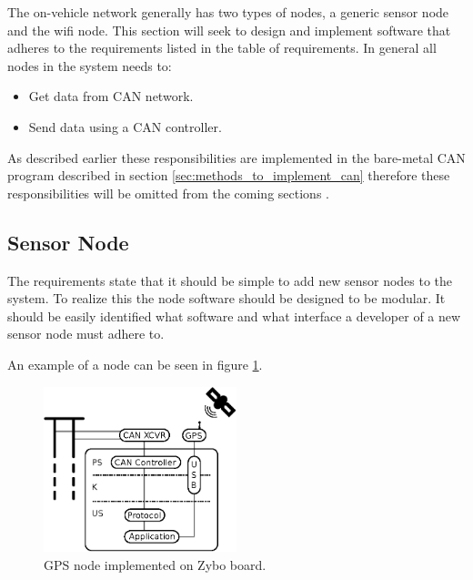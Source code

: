 The on-vehicle network generally has two types of nodes, a generic sensor node and the wifi node.
This section will seek to design and implement software that adheres to the requirements listed in the table of requirements.
In general all nodes in the system needs to:
\begin{itemize}
\item Get data from CAN network.
\item Send data using a CAN controller.
\end{itemize}
As described earlier these responsibilities are implemented in the bare-metal CAN program described in section \ref{sec:methods_to_implement_can} therefore these responsibilities will be omitted from the coming sections .

\subsection{Sensor Node}
\label{sec:sensor_node}
The requirements state that it should be simple to add new sensor nodes to the system. 
To realize this the node software should be designed to be modular.
It should be easily identified what software and what interface a developer of a new sensor node must adhere to.

An example of a node can be seen in figure \ref{fig:gps_node}.


\begin{figure}[!h]
\centering
\includegraphics[width=0.5\textwidth]{graphics/analysis_gps.eps}
\caption{GPS node implemented on Zybo board.}
\label{fig:gps_node}
\end{figure}

